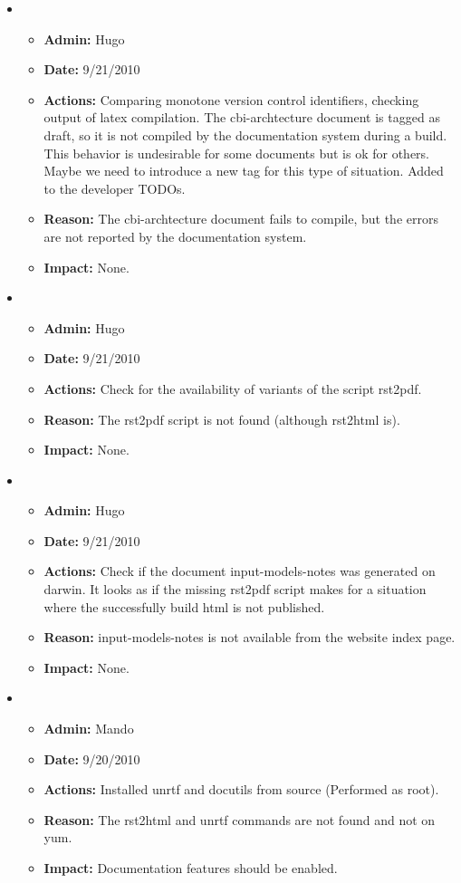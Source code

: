 \documentclass[12pt]{article}
\begin{document}
\begin{itemize}
\item 
\begin{itemize}
\item[] {\bf Admin:} Hugo
\item[] {\bf Date:} 9/21/2010 
\item[] {\bf Actions:} Comparing monotone version control identifiers, checking output of latex compilation.  The cbi-archtecture document is tagged as draft, so it is not compiled by the documentation system during a build.  This behavior is undesirable for some documents but is ok for others.  Maybe we need to introduce a new tag for this type of situation.  Added to the developer TODOs.
\item[] {\bf Reason:} The cbi-archtecture document fails to compile, but the errors are not reported by the documentation system.
\item[] {\bf Impact:} None.
\end{itemize}

\item 
\begin{itemize}
\item[] {\bf Admin:} Hugo
\item[] {\bf Date:} 9/21/2010 
\item[] {\bf Actions:} Check for the availability of variants of the
  script rst2pdf.
\item[] {\bf Reason:} The rst2pdf script is not found (although
  rst2html is).
\item[] {\bf Impact:} None.
\end{itemize}

\item 
\begin{itemize}
\item[] {\bf Admin:} Hugo
\item[] {\bf Date:} 9/21/2010 
\item[] {\bf Actions:} Check if the document input-models-notes was
  generated on darwin.  It looks as if the missing rst2pdf script
  makes for a situation where the successfully build html is not
  published.
\item[] {\bf Reason:} input-models-notes is not available from the
  website index page.
\item[] {\bf Impact:} None.
\end{itemize}

\item 
\begin{itemize}
\item[] {\bf Admin:} Mando
\item[] {\bf Date:} 9/20/2010 
\item[] {\bf Actions:} Installed unrtf and docutils from source (Performed as root).
\item[] {\bf Reason:} The rst2html and unrtf commands are not found and not on yum.
\item[] {\bf Impact:} Documentation features should be enabled.
\end{itemize}


\end{itemize}
\end{document}
